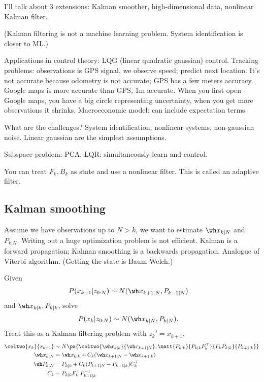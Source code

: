 I'll talk about 3 extensions: Kalman smoother, high-dimensional data, nonlinear Kalman filter.

%
(Kalman filtering is not a machine learning problem. System identification is closer to ML.)


Applications in control theory: LQG (linear quadratic gaussian) control.
Tracking problems: observations is GPS signal, we observe speed; predict next location. It's not accurate because odometry is not accurate; GPS has a few meters accuracy. Google maps is more accurate than GPS, 1m accurate. When you first open Google maps, you have a big circle representing uncertainty, when you get more observations it shrinks.
Macroeconomic model: can include expectation terms. 

What are the challenges? System identification, nonlinear systems, non-gaussian noise.
Linear gaussian are the simplest assumptions.

Subspace problem: PCA.
LQR: simultaneously learn and control. %

You can treat $F_k,B_k$ as state and use a nonlinear filter. This is called an  adaptive filter.



\subsection{Kalman smoothing}

Assume we have observations up to $N>k$, we want to estimate $\wh x_{k|N}$ and $P_{k|N}$. Writing out a huge optimization problem is not efficient. Kalman is a forward propagation; Kalman smoothing is a backwards propagation. Analogue of Viterbi algorithm. (Getting the state is Baum-Welch.)

Given 
\begin{align}
P(x_{k+1}|z_{0:N})
&\sim N(\wh x_{k+1|N} , P_{k-1|N})
\end{align}
and $\wh x_{k|k}, P_{k|k}$, solve
\begin{align}
P(x_k |z_{0:N})&\sim N(\wh x_{k|N}, P_{k|N}).
\end{align}
Treat this as a Kalman filtering problem with $z_k'=x_{k+1}$. 
\begin{align}
\coltwo{x_k}{x_{k+1}}
&\sim 
N\pa{
\coltwo{\wh x_{k|k}}{\wh x_{k+1|N}},
\matt{P_{k|k}}{P_{k|k}F_k^\top}{F_kP_{k|k}}{P_{k+1|k}}
}\\
\wh x_{k|N} &= \wh x_{k|k}+C_k(\wh x_{k+1|N}-\wh x_{k+1|k})\\
\wh P_{k|N} &=P_{k|k} + C_k (P_{k+1|N} - P_{k+1|k})C_k^\top \\
C_k &= P_{k|k}F_k^\top P_{k+1|k}^{-1}
\end{align}

